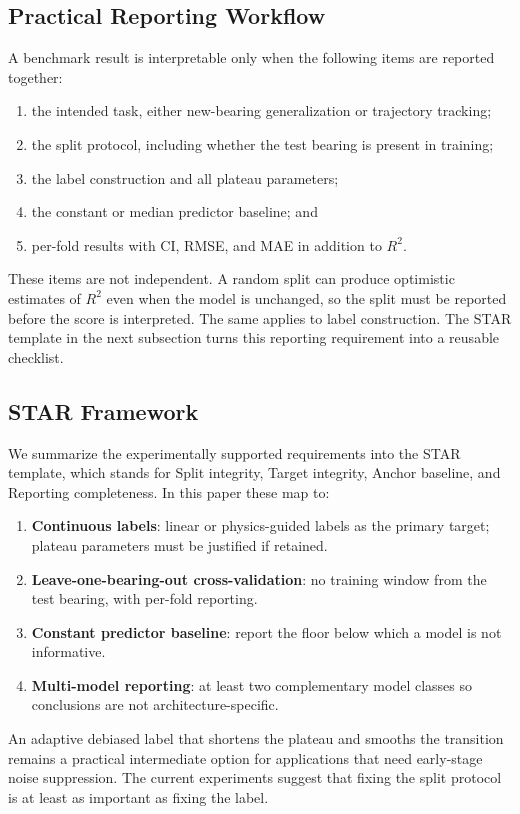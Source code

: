 \documentclass[pdflatex,sn-mathphys-num]{sn-jnl}
\begin{document}
\subsection{Practical Reporting Workflow}
A benchmark result is interpretable only when the following items are reported together:
\begin{enumerate}
    \item the intended task, either new-bearing generalization or trajectory tracking;
    \item the split protocol, including whether the test bearing is present in training;
    \item the label construction and all plateau parameters;
    \item the constant or median predictor baseline; and
    \item per-fold results with CI, RMSE, and MAE in addition to $R^2$.
\end{enumerate}
These items are not independent. A random split can produce optimistic estimates of $R^2$ even when the model is unchanged, so the split must be reported before the score is interpreted. The same applies to label construction. The STAR template in the next subsection turns this reporting requirement into a reusable checklist.

\subsection{STAR Framework}
We summarize the experimentally supported requirements into the STAR template, which stands for Split integrity, Target integrity, Anchor baseline, and Reporting completeness. In this paper these map to:
\begin{enumerate}
    \item \textbf{Continuous labels}: linear or physics-guided labels as the primary target; plateau parameters must be justified if retained.
    \item \textbf{Leave-one-bearing-out cross-validation}: no training window from the test bearing, with per-fold reporting.
    \item \textbf{Constant predictor baseline}: report the floor below which a model is not informative.
    \item \textbf{Multi-model reporting}: at least two complementary model classes so conclusions are not architecture-specific.
\end{enumerate}
An adaptive debiased label that shortens the plateau and smooths the transition remains a practical intermediate option for applications that need early-stage noise suppression. The current experiments suggest that fixing the split protocol is at least as important as fixing the label.
\end{document}
